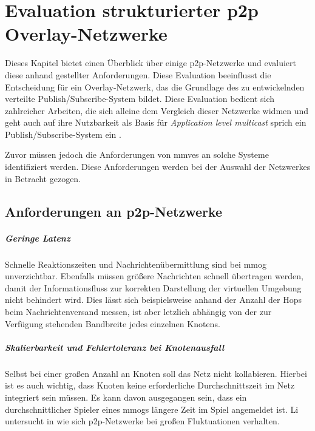 \chapter{Evaluation strukturierter p2p Overlay-Netzwerke}
\label{chap:evaluation_p2p}

Dieses Kapitel bietet einen Überblick über einige p2p-Netzwerke und evaluiert diese anhand gestellter Anforderungen. Diese Evaluation beeinflusst die Entscheidung für ein Overlay-Netzwerk, das die Grundlage des zu entwickelnden verteilte Publish/Subscribe-System bildet. Diese Evaluation bedient sich zahlreicher Arbeiten, die sich alleine dem Vergleich dieser Netzwerke widmen \cite{Lua2005Survey, Goetz2005, Li2004Comparing, Darlagiannis2006Peertopeer, Castro2002Secure, Bo2003PeertoPeer} und geht auch auf ihre Nutzbarkeit als Basis für \emph{Application level multicast} sprich ein Publish/Subscribe-System ein \cite{Hosseini2007Survey, Fahmy2007, Castro2003Evaluation, Ratnasamy2001}.

Zuvor müssen jedoch die Anforderungen von \acp{mmve} an solche Systeme identifiziert werden. Diese Anforderungen werden bei der Auswahl der Netzwerkes in Betracht gezogen.

\section{Anforderungen an p2p-Netzwerke}

\paragraph{Geringe Latenz} Schnelle Reaktionszeiten und Nachrichtenübermittlung sind bei \ac{mmog} unverzichtbar. Ebenfalls müssen größere Nachrichten schnell übertragen werden, damit der Informationsfluss zur korrekten Darstellung der virtuellen Umgebung nicht behindert wird. Dies lässt sich beispielsweise anhand der Anzahl der Hops beim Nachrichtenversand messen, ist aber letzlich abhängig von der zur Verfügung stehenden Bandbreite jedes einzelnen Knotens.

\paragraph{Skalierbarkeit und Fehlertoleranz bei Knotenausfall} Selbst bei einer großen Anzahl an Knoten soll das Netz nicht kollabieren. Hierbei ist es auch wichtig, dass Knoten keine erforderliche Durchschnittszeit im Netz integriert sein müssen. Es kann davon ausgegangen sein, dass ein durchschnittlicher Spieler eines \acp{mmog} längere Zeit im Spiel angemeldet ist. Li untersucht in \cite{Li2004Comparing} wie sich p2p-Netzwerke bei großen Fluktuationen verhalten.

